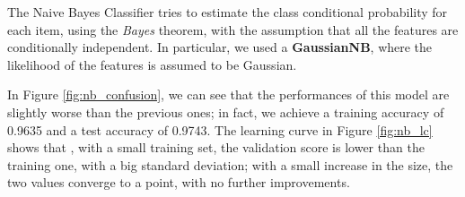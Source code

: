The Naive Bayes Classifier tries to estimate the class conditional probability for each item, using the \emph{Bayes} theorem, with the assumption that all the features are conditionally independent. In particular, we used a \textbf{GaussianNB}, where the likelihood of the features is assumed to be Gaussian.

In Figure \ref{fig:nb_confusion}, we can see that the performances of this model are slightly worse than the previous ones; in fact, we achieve a training accuracy of 0.9635 and a test accuracy of 0.9743.  
The learning curve in Figure \ref{fig:nb_lc} shows that , with a small training set, the validation score is lower than the training one, with a big standard deviation; with a small increase in the size, the two values converge to a point, with no further improvements.

